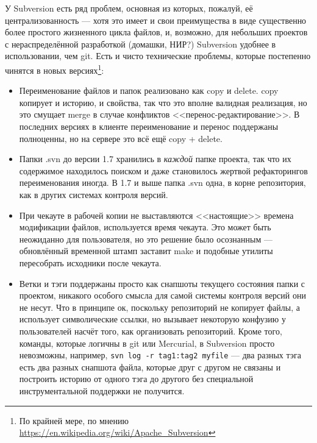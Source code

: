 \documentclass[a5paper]{article}
\begin{document}
У Subversion есть ряд проблем, основная из которых, пожалуй, её централизованность --- хотя это имеет и свои преимущества в виде существенно более простого жизненного цикла файлов, и, возможно, для небольших проектов с нераспределённой разработкой (домашки, НИР?) Subversion удобнее в использовании, чем git. Есть и чисто технические проблемы, которые постепенно чинятся в новых версиях\footnote{По крайней мере, по мнению \url{https://en.wikipedia.org/wiki/Apache\_Subversion}}:

\begin{itemize}
	\item Переименование файлов и папок реализовано как copy и delete. copy копирует и историю, и свойства, так что это вполне валидная реализация, но это смущает merge в случае конфликтов <<перенос-редактирование>>. В последних версиях в клиенте переименование и перенос поддержаны полноценны, но на сервере это всё ещё copy + delete.
	\item Папки .svn до версии 1.7 хранились в \textit{каждой} папке проекта, так что их содержимое находилось поиском и даже становилось жертвой рефакторингов переименования иногда. В 1.7 и выше папка .svn одна, в корне репозитория, как в других системах контроля версий.
	\item При чекауте в рабочей копии не выставляются <<настоящие>> времена модификации файлов, используется время чекаута. Это может быть неожиданно для пользователя, но это решение было осознанным --- обновлённый временной штамп заставит make и подобные утилиты пересобрать исходники после чекаута.
	\item Ветки и тэги поддержаны просто как снапшоты текущего состояния папки с проектом, никакого особого смысла для самой системы контроля версий они не несут. Что в принципе ок, поскольку репозиторий не копирует файлы, а использует символические ссылки, но вызывает некоторую конфузию у пользователей насчёт того, как организовать репозиторий. Кроме того, команды, которые логичны в git или Mercurial, в Subversion просто невозможны, например, \verb|svn log -r tag1:tag2 myfile| --- два разных тэга есть два разных снапшота файла, которые друг с другом не связаны и построить историю от одного тэга до другого без специальной инструментальной поддержки не получится.
\end{itemize}
\end{document}
